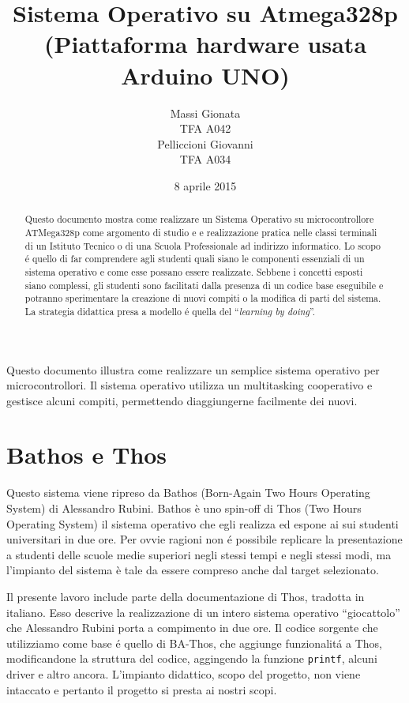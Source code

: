 \documentclass[a4paper,12pt]{report}
\title{Sistema Operativo su Atmega328p (Piattaforma hardware usata Arduino UNO)}
\author{Massi Gionata \\ TFA A042\\Pelliccioni Giovanni\\ TFA A034}
\date{8 aprile 2015}
\begin{document}
\maketitle 
\begin{abstract} 
Questo documento mostra come realizzare un Sistema Operativo su microcontrollore ATMega328p come argomento di studio e e realizzazione pratica nelle classi terminali di un Istituto Tecnico o di una Scuola Professionale ad indirizzo informatico. Lo scopo \'e quello di far comprendere agli studenti quali siano le componenti essenziali di un sistema operativo e come esse possano essere realizzate. Sebbene i concetti esposti siano complessi, gli studenti sono facilitati dalla presenza di un codice base eseguibile e potranno sperimentare la creazione di nuovi compiti o la modifica di parti del sistema. La strategia didattica presa a modello \'e quella del ``\textit{learning by doing}''.
\end{abstract} 
 
\tableofcontents %
 



Questo documento illustra come realizzare un semplice sistema operativo per microcontrollori.
Il sistema operativo utilizza un multitasking cooperativo e gestisce alcuni compiti, permettendo diaggiungerne facilmente dei nuovi.

\chapter{Bathos e Thos}

Questo sistema viene ripreso da Bathos (Born-Again Two Hours Operating System) di Alessandro Rubini.  Bathos è uno spin-off di Thos (Two Hours Operating System) il sistema operativo che egli realizza ed espone ai sui studenti universitari in due ore. Per ovvie ragioni non \'e possibile replicare la presentazione a studenti delle scuole medie superiori negli stessi tempi e negli stessi modi, ma l'impianto del sistema \`e tale da essere compreso anche dal target selezionato.

Il presente lavoro include parte della documentazione di Thos, tradotta in italiano. Esso descrive la realizzazione di un intero sistema operativo ``giocattolo'' che Alessandro Rubini porta a compimento in due ore. Il codice sorgente che utilizziamo come base \'e quello di BA-Thos, che aggiunge funzionalit\'a a Thos, modificandone la struttura del codice, aggingendo la funzione \texttt{printf}, alcuni driver e altro ancora.
L'impianto didattico, scopo del progetto, non viene intaccato e pertanto il progetto si presta ai nostri scopi.
\end{document}
